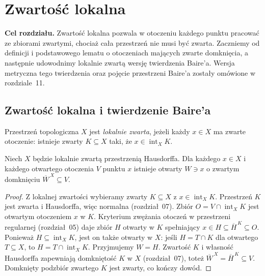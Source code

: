 \chapter{Zwartość lokalna}
\label{ch:topog-zwartosc-lokalna}

\noindent\textbf{Cel rozdziału.}
Zwartość lokalna pozwala w otoczeniu każdego punktu
pracować ze zbiorami zwartymi, chociaż cała przestrzeń
nie musi być zwarta. Zaczniemy od definicji i podstawowego
lematu o otoczeniach mających zwarte domknięcia,
a następnie udowodnimy lokalnie zwartą wersję
twierdzenia Baire'a. Wersja metryczna tego twierdzenia
oraz pojęcie przestrzeni Baire'a zostały omówione
w rozdziale~11.

\section{Zwartość lokalna i twierdzenie Baire'a}
\label{sec:topog-baire-lokalnie-zwarte}

\begin{definicja}
\label{def:topog-baire-lokalna-zwartosc}
Przestrzeń topologiczna $X$ jest
\emph{lokalnie zwarta}, jeżeli każdy
$x\in X$ ma zwarte otoczenie:
istnieje zwarty $K\subseteq X$
taki, że $x\in\operatorname{int}_X K$.
\end{definicja}

\begin{lemat}
\label{lem:topog-baire-zwarte-domkniecie}
Niech $X$ będzie lokalnie zwartą przestrzenią Hausdorffa.
Dla każdego $x\in X$ i każdego otwartego otoczenia
$V$ punktu $x$ istnieje otwarty $W\ni x$
o zwartym domknięciu $\overline W^{\,X}\subseteq V$.
\end{lemat}
\begin{proof}
Z lokalnej zwartości wybieramy zwarty
$K\subseteq X$ z $x\in\operatorname{int}_X K$.
Przestrzeń $K$ jest zwarta i Hausdorffa,
więc normalna (rozdział~07). Zbiór
$O=V\cap\operatorname{int}_X K$ jest
otwartym otoczeniem $x$ w $K$.
Kryterium zwężania otoczeń w przestrzeni
regularnej (rozdział~05) daje zbiór $H$
otwarty w $K$ spełniający
$x\in H\subseteq\overline H^{\,K}\subseteq O$.
Ponieważ $H\subseteq\operatorname{int}_X K$,
jest on także otwarty w $X$: jeśli
$H=T\cap K$ dla otwartego $T\subseteq X$,
to $H=T\cap\operatorname{int}_X K$.
Przyjmujemy $W=H$. Zwartość $K$
i własność Hausdorffa zapewniają domkniętość
$K$ w $X$ (rozdział~07), toteż
$\overline W^{\,X}=\overline H^{\,K}\subseteq V$.
Domknięty podzbiór zwartego $K$
jest zwarty, co kończy dowód.
\end{proof}

